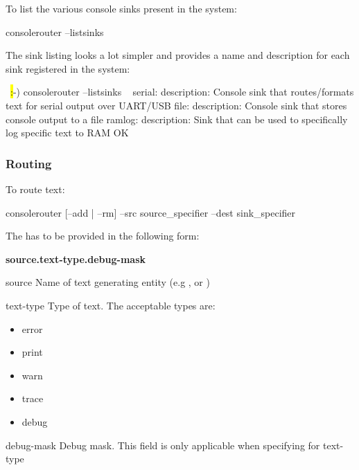 To list the various console sinks present in the system:

\begin{CommandLine}
consolerouter --listsinks
\end{CommandLine}

The sink listing looks a lot simpler and provides a name and description for each sink registered 
in the system:

\begin{LuaCode}
~\hl:-) consolerouter --listsinks ~
serial:
	description: Console sink that routes/formats text for serial output over UART/USB
file:
	description: Console sink that stores console output to a file
ramlog:
	description: Sink that can be used to specifically log specific
    text to RAM
OK
\end{LuaCode}

\subsubsection{Routing}

To route text:

\begin{CommandLine}
consolerouter [--add | --rm] --src source_specifier --dest sink_specifier
\end{CommandLine}

The  has to be provided in the following form:

\begin{center}
    \bfseries{source.text-type.debug-mask}
\end{center}


\begin{Definition}
\item[source] Name of text generating entity (e.g ,  or )
\item[text-type] Type of text. The acceptable types are:
    \begin{itemize} \parskip0pt
        \item error
        \item print 
        \item warn 
        \item trace 
        \item debug
    \end{itemize}
\item[debug-mask] Debug mask. This field is only applicable when specifying  for text-type 
\end{Definition}

